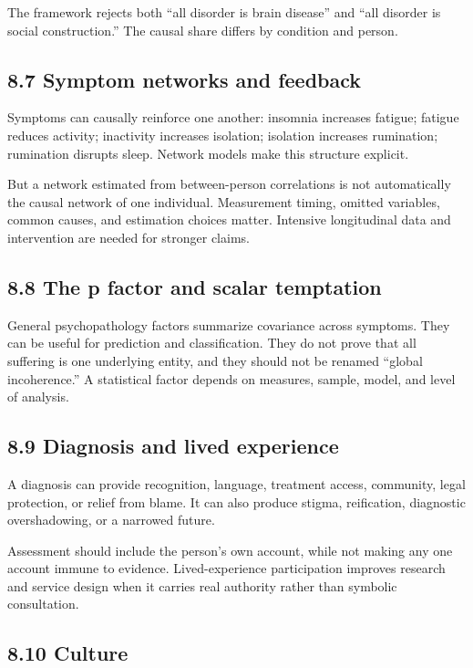\documentclass[
  11pt,
]{article}
\begin{document}
The framework rejects both ``all disorder is brain disease'' and ``all
disorder is social construction.'' The causal share differs by condition
and person.

\subsection{8.7 Symptom networks and
feedback}\label{symptom-networks-and-feedback}

Symptoms can causally reinforce one another: insomnia increases fatigue;
fatigue reduces activity; inactivity increases isolation; isolation
increases rumination; rumination disrupts sleep. Network models make
this structure explicit.

But a network estimated from between-person correlations is not
automatically the causal network of one individual. Measurement timing,
omitted variables, common causes, and estimation choices matter.
Intensive longitudinal data and intervention are needed for stronger
claims.

\subsection{8.8 The p factor and scalar
temptation}\label{the-p-factor-and-scalar-temptation}

General psychopathology factors summarize covariance across symptoms.
They can be useful for prediction and classification. They do not prove
that all suffering is one underlying entity, and they should not be
renamed ``global incoherence.'' A statistical factor depends on
measures, sample, model, and level of analysis.

\subsection{8.9 Diagnosis and lived
experience}\label{diagnosis-and-lived-experience}

A diagnosis can provide recognition, language, treatment access,
community, legal protection, or relief from blame. It can also produce
stigma, reification, diagnostic overshadowing, or a narrowed future.

Assessment should include the person's own account, while not making any
one account immune to evidence. Lived-experience participation improves
research and service design when it carries real authority rather than
symbolic consultation.

\subsection{8.10 Culture}\label{culture}
\end{document}
